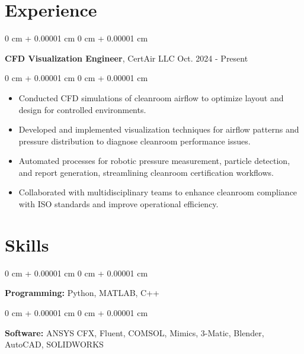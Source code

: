 \documentclass[10pt, letterpaper]{article}
\newenvironment{highlights}{
    \begin{itemize}[
        topsep=0.10 cm,
        parsep=0.10 cm,
        partopsep=0pt,
        itemsep=0pt,
        leftmargin=0 cm + 10pt
    ]
}{
    \end{itemize}
} %
\newenvironment{onecolentry}{
    \begin{adjustwidth}{
        0 cm + 0.00001 cm
    }{
        0 cm + 0.00001 cm
    }
}{
    \end{adjustwidth}
} %
\newenvironment{twocolentry}[2][]{
    \onecolentry
    \def\secondColumn{#2}
    \setcolumnwidth{\fill, 4.5 cm}
    \begin{paracol}{2}
}{ 
    \switchcolumn \raggedleft \secondColumn
    \end{paracol}
    \endonecolentry
} %
\begin{document}
    \section{Experience}
        \begin{twocolentry}{
            Oct. 2024 - Present
        }
            \textbf{CFD Visualization Engineer}, CertAir LLC\end{twocolentry}

        \vspace{0.10 cm}
        \begin{onecolentry}
            \begin{highlights}
                \item Conducted CFD simulations of cleanroom airflow to optimize layout and design for controlled environments.
                \item Developed and implemented visualization techniques for airflow patterns and pressure distribution to diagnose cleanroom performance issues.
                \item Automated processes for robotic pressure measurement, particle detection, and report generation, streamlining cleanroom certification workflows.
                \item Collaborated with multidisciplinary teams to enhance cleanroom compliance with ISO standards and improve operational efficiency.
            \end{highlights}
        \end{onecolentry}

        \vspace{0.2 cm}

    \section{Skills}

    \begin{onecolentry}
        \textbf{Programming:} Python, MATLAB, C++ 
    \end{onecolentry}

    \vspace{0.2 cm}

    \begin{onecolentry}
        \textbf{Software:} ANSYS CFX, Fluent, COMSOL, Mimics, 3-Matic, Blender, AutoCAD, SOLIDWORKS 
    \end{onecolentry}

    \vspace{0.2 cm}
\end{document}

